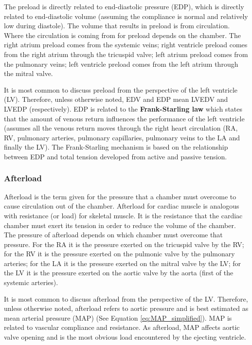 The preload is directly related to end-diastolic pressure (EDP), which is directly related to end-diastolic volume (assuming the compliance is normal and relatively low during diastole). The volume that results in preload is from circulation. Where the circulation is coming from for preload depends on the chamber. The right atrium preload comes from the systemic veins; right ventricle preload comes from the right atrium through the tricuspid valve; left atrium preload comes from the pulmonary veins; left ventricle preload comes from the left atrium through the mitral valve. 

It is most common to discuss preload from the perspective of the left ventricle (LV). Therefore, unless otherwise noted, EDV and EDP mean LVEDV and LVEDP (respectively). EDP is related to the \textbf{Frank-Starling law} which states that the amount of venous return influences the performance of the left ventricle (assumes all the venous return moves through the right heart circulation (RA, RV, pulmonary arteries, pulmonary capillaries, pulmonary veins to the LA and finally the LV). The Frank-Starling mechanism is based on the relationship between EDP and total tension developed from active and passive tension.

\subsubsection{Afterload}
Afterload is the term given for the pressure that a chamber must overcome to cause circulation out of the chamber. Afterload for cardiac muscle is analogous with resistance (or load) for skeletal muscle. It is the resistance that the cardiac chamber must exert its tension in order to reduce the volume of the chamber. The pressure of afterload depends on which chamber must overcome that pressure. For the RA it is the pressure exerted on the tricuspid valve by the RV; for the RV it is the pressure exerted on the pulmonic valve by the pulmonary arteries; for the LA it is the pressure exerted on the mitral valve by the LV; for the LV it is the pressure exerted on the aortic valve by the aorta (first of the systemic arteries). 

It is most common to discuss afterload from the perspective of the LV. Therefore, unless otherwise noted, afterload refers to aortic pressure and is best estimated as mean arterial pressure (MAP) (See Equation \ref{eq:MAP_simplified}). MAP is related to vascular compliance and resistance. As afterload, MAP affects aortic valve opening and is the most obvious load encountered by the ejecting ventricle. 

